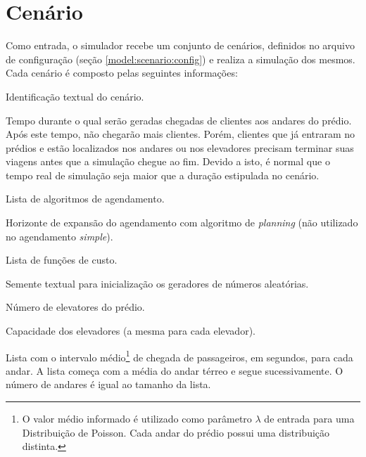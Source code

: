 \section{\label{model:scenario}Cenário}

Como entrada, o simulador recebe um conjunto de cenários, definidos no arquivo
de configuração (seção \ref{model:scenario:config}) e realiza a simulação dos
mesmos. Cada cenário é composto pelas seguintes informações:

\begin{description}[leftmargin=!,labelwidth=\widthof{\bfseries Função de Custo}]
  \item[Nome]

  Identificação textual do cenário.

  \item[Duração]

  Tempo durante o qual serão geradas chegadas de clientes aos andares do prédio.
  Após este tempo, não chegarão mais clientes. Porém, clientes que já entraram
  no prédios e estão localizados nos andares ou nos elevadores precisam terminar
  suas viagens antes que a simulação chegue ao fim. Devido a isto, é normal que
  o tempo real de simulação seja maior que a duração estipulada no cenário.

  \item[Agendamento]

  Lista de algoritmos de agendamento.

  \item[Horizonte]

  Horizonte de expansão do agendamento com algoritmo de \textit{planning} (não utilizado no agendamento \textit{simple}).

  \item[Função de Custo]

  Lista de funções de custo.

  \item[Semente]

  Semente textual para inicialização os geradores de números aleatórias.

  \item[Elevadores]

  Número de elevatores do prédio.

  \item[Capacidade]

  Capacidade dos elevadores (a mesma para cada elevador).

  \item[Andares]

  Lista com o intervalo médio\footnote{O valor médio informado é utilizado como
  parâmetro $\lambda$ de entrada para uma Distribuição de Poisson. Cada andar do
  prédio possui uma distribuição distinta.} de chegada de passageiros, em
  segundos, para cada andar. A lista começa com a média do andar térreo e segue
  sucessivamente. O número de andares é igual ao tamanho da lista.

\end{description}

